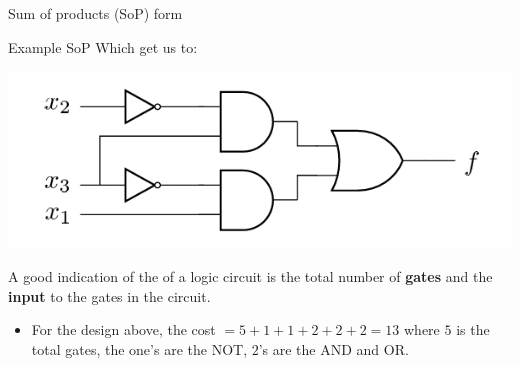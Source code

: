 \begin{parag}{Sum of products (SoP) form}
\begin{subparag}{Example SoP}
    Which get us to:
    \begin{center}
    \includegraphics[scale=0.6]{logicgate2025-03-10.png}
\end{center} 
    A good indication of the  of a logic circuit is the total number of \textbf{gates} and the \textbf{input} to the gates in the circuit.
    \begin{itemize}
        \item For the design above, the cost $ = 5 + 1 + 1 + 2 + 2 + 2 = 13$ where $5$ is the total gates, the one's are the NOT, $2$'s are the AND and OR.
            

\end{itemize}
\end{subparag}
\end{parag}
